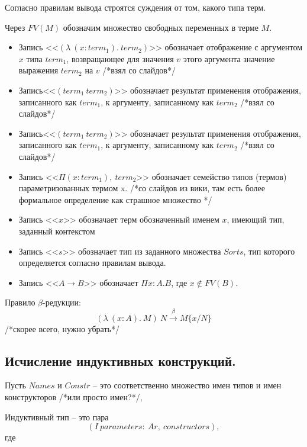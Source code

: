 \documentclass[12pt]{article}
\begin{document}
Согласно правилам вывода 
строятся суждения от том, какого типа терм.

Через $FV(M)$ обозначим множество свободных переменных в терме $M$.
\begin{itemize}
    \item Запись <<$(\lambda\ (x: term_1).\ term_2)$>>
обозначает отображение с аргументом $x$ типа $term_1$, 
возвращающее для значения $v$ этого аргумента 
значение выражения $term_2$ на $v$ /*взял со слайдов*/

    \item Запись<<$(term_1\ term_2)$>> обозначает результат 
применения отображения,
записанного как $term_1$, к аргументу, 
записанному как $term_2$ /*взял со слайдов*/

    \item Запись<<$(term_1\ term_2)$>> обозначает результат 
применения отображения,
записанного как $term_1$, к аргументу, 
записанному как $term_2$ /*взял со слайдов*/

    \item Запись <<$\Pi (x:term_1),\ term_2$>> 
обозначает семейство типов (термов)
параметризованных термом x. /*со слайдов из вики, там есть более формальное определение как страшное множество */

    \item Запись <<$x$>> обозначает терм обозначенный именем $x$, имеющий тип, заданный контекстом
    
    \item Запись <<$s$>> обозначает тип из заданного множества $Sorts$, тип которого определяется согласно правилам вывода.
    
    \item Запись <<$A \xrightarrow{} B$>> обозначает $\Pi x:A. B$, где $x \notin FV(B)$.
\end{itemize}





Правило $\beta$-редукции:
$$(\lambda\ (x: A).\ M)\ N \xrightarrow{\beta} M\{x/N\}$$
/*скорее всего, нужно убрать*/


\subsection{Исчисление индуктивных конструкций.}
Пусть $Names$ и $Constr$ -- это соответственно множество имен типов и имен конструкторов /*или просто имен?*/, 

Индуктивный тип -- это пара $$(I\ parameters:\ Ar,\ constructors),$$ где
\end{document}
